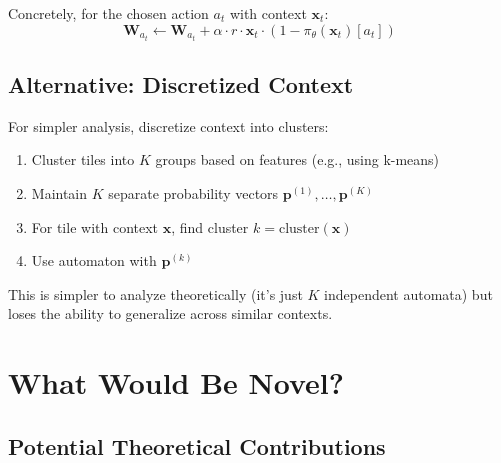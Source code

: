 \documentclass[11pt]{article}
\begin{document}
Concretely, for the chosen action $a_t$ with context $\mathbf{x}_t$:
\[
\mathbf{W}_{a_t} \leftarrow \mathbf{W}_{a_t} + \alpha \cdot r \cdot \mathbf{x}_t \cdot (1 - \pi_\theta(\mathbf{x}_t)[a_t])
\]

\subsection{Alternative: Discretized Context}

For simpler analysis, discretize context into clusters:

\begin{enumerate}
  \item Cluster tiles into $K$ groups based on features (e.g., using k-means)
  \item Maintain $K$ separate probability vectors $\mathbf{p}^{(1)}, \ldots, \mathbf{p}^{(K)}$
  \item For tile with context $\mathbf{x}$, find cluster $k = \text{cluster}(\mathbf{x})$
  \item Use automaton with $\mathbf{p}^{(k)}$
\end{enumerate}

This is simpler to analyze theoretically (it's just $K$ independent automata) but loses the ability to generalize across similar contexts.

\section{What Would Be Novel?}

\subsection{Potential Theoretical Contributions}
\end{document}
